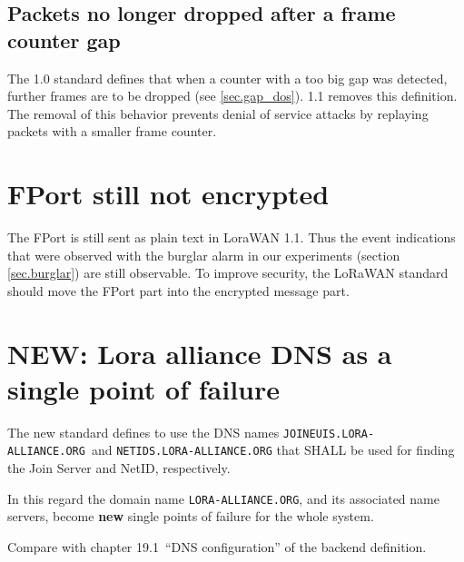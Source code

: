{\subsection{Packets no longer dropped after a frame counter gap}

The 1.0 standard defines that when a counter with a too big gap
was detected, further frames are to be dropped (see \ref{sec.gap_dos}). 1.1 removes this
definition. The removal of this behavior prevents denial of service attacks by replaying
packets with a smaller frame counter.


\section{FPort still not encrypted}

{The FPort is still sent as plain text in LoraWAN 1.1. Thus the event
indications that were observed with the burglar alarm in our experiments (section \ref{sec.burglar})
are still observable. To improve security, the LoRaWAN standard should
move the FPort part into the encrypted message part.}

\section{NEW: Lora alliance DNS as a single point of failure}

The new standard defines to use the DNS names
\texttt{JOINEUIS.LORA-ALLIANCE.ORG}~and \texttt{NETIDS.LORA-ALLIANCE.ORG} that
SHALL be used for finding the Join Server and NetID, respectively.

In this regard the domain name \texttt{LORA-ALLIANCE.ORG}, and its associated name servers, become \textbf{new} single points of failure for the whole system.

{Compare with chapter 19.1~``DNS configuration'' of the backend
definition.}

}
